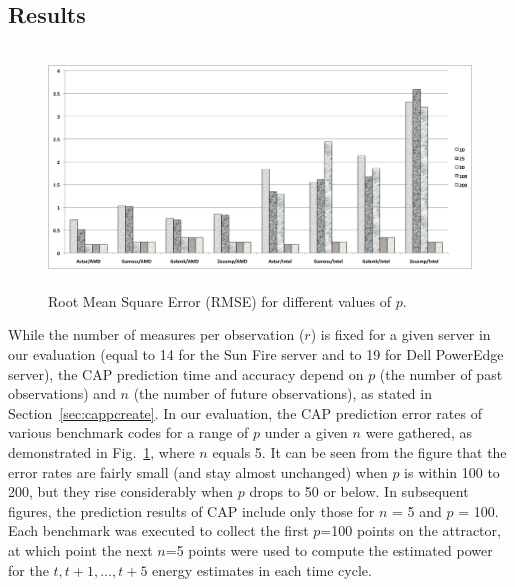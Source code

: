 \documentclass[acmtaco]{acmtrans2m}
\newcommand{\figurename}{Fig.}
\begin{document}
\subsection{Results}
\label{sec:htcase}
\begin{figure}[tp]
  \centering
  \includegraphics[width=1.0\linewidth,height=2.5in]{rmsep}
  \caption{Root Mean Square Error (RMSE) for different values of $p$.}
  \label{fig:rmsep}
\end{figure}
While the number of measures per observation ($r$) is fixed for a given
server in our evaluation (equal to 14 for the Sun Fire server and to 19
for Dell PowerEdge server), the CAP prediction time and accuracy depend
on $p$ (the number of past observations) and $n$ (the number of future
observations), as stated in Section~\ref{sec:cappcreate}.  In our
evaluation, the CAP prediction error rates of various benchmark codes
for a range of $p$ under a given $n$ were gathered, as demonstrated in
\figurename~\ref{fig:rmsep}, where $n$ equals 5.  It can be seen from
the figure that the error rates are fairly small (and stay almost
unchanged) when $p$ is within 100 to 200, but they rise considerably
when $p$ drops to 50 or below.  In subsequent figures, the prediction
results of CAP include only those for $n$ = 5 and $p$ = 100.  Each
benchmark was executed to collect the first $p$=100 points on the
attractor, at which point the next $n$=5 points were used to
compute the estimated power for the $t, t+1,\ldots,t+5$ energy estimates
in each time cycle.
\end{document}
